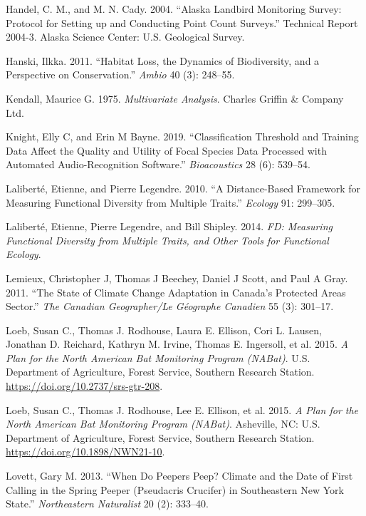\documentclass[
  letterpaper,
  DIV=11,
  numbers=noendperiod]{scrartcl}
\newlength{\cslhangindent}
\newenvironment{CSLReferences}[2] %
 {\begin{list}{}{%
  \setlength{\itemindent}{0pt}
  \setlength{\leftmargin}{0pt}
  \setlength{\parsep}{0pt}
  \ifodd #1
   \setlength{\leftmargin}{\cslhangindent}
   \setlength{\itemindent}{-1\cslhangindent}
  \fi
  \setlength{\itemsep}{#2\baselineskip}}}
 {\end{list}}
\begin{document}
\begin{CSLReferences}{1}{0}
Handel, C. M., and M. N. Cady. 2004. {``Alaska Landbird Monitoring
Survey: Protocol for Setting up and Conducting Point Count Surveys.''}
Technical Report 2004-3. Alaska Science Center: U.S. Geological Survey.

Hanski, Ilkka. 2011. {``Habitat Loss, the Dynamics of Biodiversity, and
a Perspective on Conservation.''} \emph{Ambio} 40 (3): 248--55.

Kendall, Maurice G. 1975. \emph{Multivariate Analysis}. Charles Griffin
\& Company Ltd.

Knight, Elly C, and Erin M Bayne. 2019. {``Classification Threshold and
Training Data Affect the Quality and Utility of Focal Species Data
Processed with Automated Audio-Recognition Software.''}
\emph{Bioacoustics} 28 (6): 539--54.

Laliberté, Etienne, and Pierre Legendre. 2010. {``A Distance-Based
Framework for Measuring Functional Diversity from Multiple Traits.''}
\emph{Ecology} 91: 299--305.

Laliberté, Etienne, Pierre Legendre, and Bill Shipley. 2014. \emph{FD:
Measuring Functional Diversity from Multiple Traits, and Other Tools for
Functional Ecology}.

Lemieux, Christopher J, Thomas J Beechey, Daniel J Scott, and Paul A
Gray. 2011. {``The State of Climate Change Adaptation in Canada's
Protected Areas Sector.''} \emph{The Canadian Geographer/Le G{é}ographe
Canadien} 55 (3): 301--17.

Loeb, Susan C., Thomas J. Rodhouse, Laura E. Ellison, Cori L. Lausen,
Jonathan D. Reichard, Kathryn M. Irvine, Thomas E. Ingersoll, et al.
2015. \emph{A Plan for the North American Bat Monitoring Program
(NABat)}. U.S. Department of Agriculture, Forest Service, Southern
Research Station. \url{https://doi.org/10.2737/srs-gtr-208}.

Loeb, Susan C., Thomas J. Rodhouse, Lee E. Ellison, et al. 2015. \emph{A
Plan for the North American Bat Monitoring Program (NABat)}. Asheville,
NC: U.S. Department of Agriculture, Forest Service, Southern Research
Station. \url{https://doi.org/10.1898/NWN21-10}.

Lovett, Gary M. 2013. {``When Do Peepers Peep? Climate and the Date of
First Calling in the Spring Peeper (Pseudacris Crucifer) in Southeastern
New York State.''} \emph{Northeastern Naturalist} 20 (2): 333--40.


\end{CSLReferences}
\end{document}
